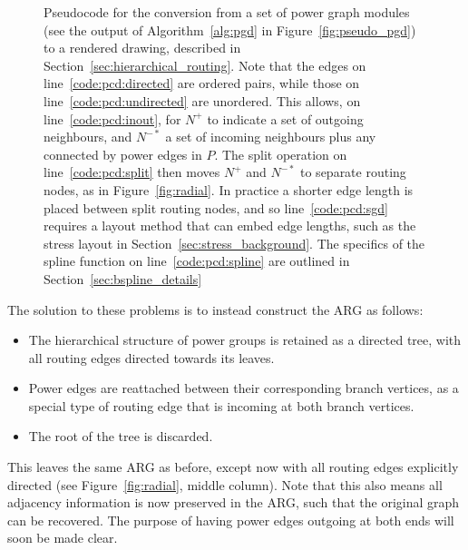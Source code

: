 \begin{figure}
  \caption[Pseudocode for power-confluent drawing]{Pseudocode for the conversion from a set of power graph modules (see the output of Algorithm~\ref{alg:pgd} in Figure~\ref{fig:pseudo_pgd}) to a rendered drawing, described in Section~\ref{sec:hierarchical_routing}. 
  Note that the edges on line~\ref{code:pcd:directed} are ordered pairs, while those on line~\ref{code:pcd:undirected} are unordered. This allows, on line~\ref{code:pcd:inout}, for $N^+$ to indicate a set of outgoing neighbours, and $N^{-*}$ a set of incoming neighbours plus any connected by power edges in $P$.
  The split operation on line~\ref{code:pcd:split} then moves $N^+$ and $N^{-*}$ to separate routing nodes, as in Figure~\ref{fig:radial}.
  In practice a shorter edge length is placed between split routing nodes, and so line~\ref{code:pcd:sgd} requires a layout method that can embed edge lengths, such as the stress layout in Section~\ref{sec:stress_background}.
  The specifics of the spline function on line~\ref{code:pcd:spline} are outlined in Section~\ref{sec:bspline_details}}
  \label{fig:pseudo_pcd}
\end{figure}

The solution to these problems is to instead construct the ARG as follows:
\begin{mdframed}[backgroundcolor=WhiteSmoke]
\begin{itemize}[leftmargin=*]
  \item The hierarchical structure of power groups is retained as a directed tree, with all routing edges directed towards its leaves.
  \item Power edges are reattached between their corresponding branch vertices, as a special type of routing edge that is incoming at both branch vertices.
  \item The root of the tree is discarded.
\end{itemize}
\end{mdframed}
This leaves the same ARG as before, except now with all routing edges explicitly directed (see Figure~\ref{fig:radial}, middle column).
Note that this also means all adjacency information is now preserved in the ARG, such that the original graph can be recovered.
The purpose of having power edges outgoing at both ends will soon be made clear.

